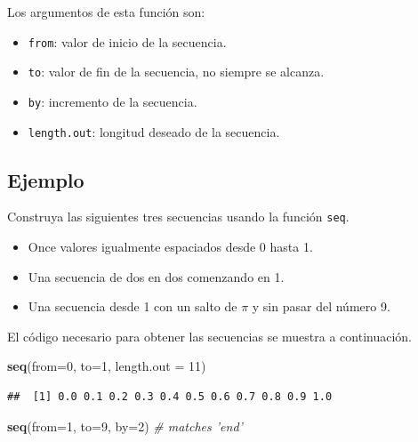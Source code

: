 \documentclass[10pt,]{krantz}
\makeatletter
\newenvironment{Shaded}{\begin{snugshade}}{\end{snugshade}}
\newcommand{\KeywordTok}[1]{\textcolor[rgb]{0.13,0.29,0.53}{\textbf{#1}}}
\newcommand{\DataTypeTok}[1]{\textcolor[rgb]{0.13,0.29,0.53}{#1}}
\newcommand{\DecValTok}[1]{\textcolor[rgb]{0.00,0.00,0.81}{#1}}
\newcommand{\CommentTok}[1]{\textcolor[rgb]{0.56,0.35,0.01}{\textit{#1}}}
\newcommand{\NormalTok}[1]{#1}
\providecommand{\tightlist}{%
  \setlength{\itemsep}{0pt}\setlength{\parskip}{0pt}}
\newenvironment{kframe}{%
\medskip{}
\setlength{\fboxsep}{.8em}
 \def\at@end@of@kframe{}%
 \ifinner\ifhmode%
  \def\at@end@of@kframe{\end{minipage}}%
  \begin{minipage}{\columnwidth}%
 \fi\fi%
 \def\FrameCommand##1{\hskip\@totalleftmargin \hskip-\fboxsep
 \colorbox{shadecolor}{##1}\hskip-\fboxsep
     \hskip-\linewidth \hskip-\@totalleftmargin \hskip\columnwidth}%
 \MakeFramed {\advance\hsize-\width
   \@totalleftmargin\z@ \linewidth\hsize
   \@setminipage}}%
 {\par\unskip\endMakeFramed%
 \at@end@of@kframe}
\renewenvironment{Shaded}{\begin{kframe}}{\end{kframe}}
\makeatother
\begin{document}
Los argumentos de esta función son:

\begin{itemize}
\tightlist
\item
  \texttt{from}: valor de inicio de la secuencia.
\item
  \texttt{to}: valor de fin de la secuencia, no siempre se alcanza.
\item
  \texttt{by}: incremento de la secuencia.
\item
  \texttt{length.out}: longitud deseado de la secuencia.
\end{itemize}

\subsection*{Ejemplo}\label{ejemplo-10}


Construya las siguientes tres secuencias usando la función \texttt{seq}.

\begin{itemize}
\tightlist
\item
  Once valores igualmente espaciados desde 0 hasta 1.
\item
  Una secuencia de dos en dos comenzando en 1.
\item
  Una secuencia desde 1 con un salto de \(\pi\) y sin pasar del número
  9.
\end{itemize}

El código necesario para obtener las secuencias se muestra a
continuación.

\begin{Shaded}
\begin{Highlighting}[]
\KeywordTok{seq}\NormalTok{(}\DataTypeTok{from=}\DecValTok{0}\NormalTok{, }\DataTypeTok{to=}\DecValTok{1}\NormalTok{, }\DataTypeTok{length.out =} \DecValTok{11}\NormalTok{)}
\end{Highlighting}
\end{Shaded}

\begin{verbatim}
##  [1] 0.0 0.1 0.2 0.3 0.4 0.5 0.6 0.7 0.8 0.9 1.0
\end{verbatim}

\begin{Shaded}
\begin{Highlighting}[]
\KeywordTok{seq}\NormalTok{(}\DataTypeTok{from=}\DecValTok{1}\NormalTok{, }\DataTypeTok{to=}\DecValTok{9}\NormalTok{, }\DataTypeTok{by=}\DecValTok{2}\NormalTok{)  }\CommentTok{# matches 'end'}
\end{Highlighting}
\end{Shaded}
\end{document}
